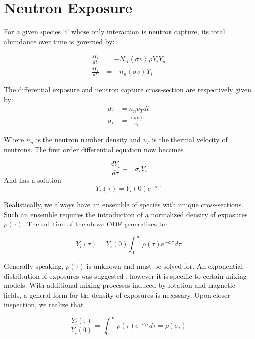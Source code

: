 \documentclass{article}
\begin{document}
\section*{Neutron Exposure}

For a given species `i' whose only interaction is neutron capture, its total abundance over time is governed by:

\begin{align*}
    \frac{d Y_{i}}{dt} &= -N_{A}\left<\sigma v\right>\rho Y_{i}Y_{n}\\
    \frac{d Y_{i}}{dt} &= -n_{n} \left<\sigma v\right> Y_{i}
\end{align*}

The differential exposure and neutron capture cross-section are respectively given by:
\begin{align*}
    d\tau &= n_{n}v_{T}dt\\
    \sigma_{i} &= \frac{\left<\sigma v\right>}{v_{T}}
\end{align*}

Where $n_{n}$ is the neutron number density and $v_{T}$ is the thermal velocity of neutrons. The first order differential equation 
now becomes

\begin{equation*}
    \frac{d Y_{i}}{d\tau} = -\sigma_{i}Y_{i}
\end{equation*}
And has a solution
\begin{equation*}
    Y_{i}(\tau) = Y_{i}(0)e^{-\sigma_{i}\tau}
\end{equation*}

Realistically, we always have an ensemble of species with unique cross-sections. Such an ensemble requires the introduction  of a 
normalized density of exposures $\rho(\tau)$. The solution of the above ODE generalizes to:

\begin{equation*}
    Y_{i}(\tau) = Y_i(0)\int_{0}^{\infty}\rho(\tau)e^{-\sigma_{i}\tau}d\tau
\end{equation*}

Generally speaking, $\rho(\tau)$ is unknown and must be solved for. An exponential distribution of exposures was suggested \cite{clayton1974s}, 
however it is specific to certain mixing models. With additional mixing processes induced by rotation and magnetic fields, a 
general form for the density of exposures is necessary. Upon closer inspection, we realize that

\begin{equation*}
    \frac{Y_{i}(\tau)}{Y_i(0)} = \int_{0}^{\infty}\rho(\tau)e^{-\sigma_{i}\tau}d\tau = \tilde{\rho}(\sigma_{i})
\end{equation*}
\end{document}
